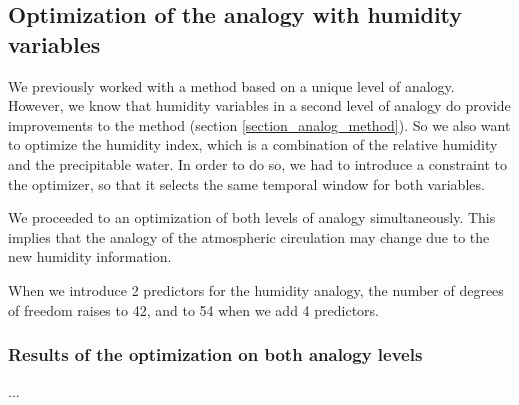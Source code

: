 \documentclass[twocol]{ametsoc}
\begin{document}

\subsection{Optimization of the analogy with humidity variables}

We previously worked with a method based on a unique level of analogy. However, we know that humidity variables in a second level of analogy do provide improvements to the method (section \ref{section_analog_method}). So we also want to optimize the humidity index, which is a combination of the relative humidity and the precipitable water. In order to do so, we had to introduce a constraint to the optimizer, so that it selects the same temporal window for both variables. 

We proceeded to an optimization of both levels of analogy simultaneously. This implies that the analogy of the atmospheric circulation may change due to the new humidity information.

When we introduce 2 predictors for the humidity analogy, the number of degrees of freedom raises to 42, and to 54 when we add 4 predictors.





\subsubsection{Results of the optimization on both analogy levels}
...

\end{document}
